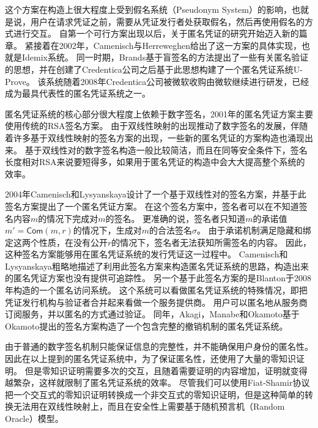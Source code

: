 这个方案在构造上很大程度上受到假名系统（Pseudonym System）\cite{chen1996access,lysyanskaya1999pseudonym}的影响，也就是说，用户在请求凭证之前，需要从凭证发行者处获取假名，然后再使用假名的方式进行交互。
自第一个可行方案出现以后，关于匿名凭证的研究开始迈入新的篇章。
紧接着在2002年，Camenisch与Herreweghen给出了这一方案的具体实现，也就是Idemix系统\cite{camenisch2002design}。
同一时期，Brands基于盲签名的方法提出了一些有关匿名验证的思想\cite{brands2000rethinking}，并在创建了Credentica公司之后基于此思想构建了一个匿名凭证系统U-Prove。
该系统随着2008年Credentica公司被微软收购由微软继续进行研发\cite{paquin2011u}，已经成为最具代表性的匿名凭证系统之一。

匿名凭证系统的核心部分很大程度上依赖于数字签名，2001年的匿名凭证方案主要使用传统的RSA签名方案。
由于双线性映射的出现推动了数字签名的发展，伴随着许多基于双线性映射的签名方案的出现\cite{boneh2001short,camenisch2004signature,okamoto2006efficient}，一些新的匿名凭证的方案构造也涌现出来。
基于双线性对的数字签名构造一般比较简洁，而且在同等安全条件下，签名长度相对RSA来说要短得多，如果用于匿名凭证的构造中会大大提高整个系统的效率。

2004年Camenisch和Lysyanskaya设计了一个基于双线性对的签名方案，并基于此签名方案提出了一个匿名凭证方案\cite{camenisch2004signature}。
在这个签名方案中，签名者可以在不知道签名内容$m$的情况下完成对$m$的签名。
更准确的说，签名者只知道$m$的承诺值$m'=\mathsf{Com}(m,r)$的情况下，生成对$m$的合法签名$\sigma$。
由于承诺机制满足隐藏和绑定这两个性质，在没有公开$r$的情况下，签名者无法获知所需签名的内容。
因此，这种签名方案能够用在匿名凭证系统的发行凭证这一过程中。
Camenisch和Lysyanskaya粗略地描述了利用此签名方案来构造匿名凭证系统的思路，构造出来的匿名凭证方案也没有提供可追踪性。
另一个基于此签名方案的是Blanton于2008年构造的一个匿名访问系统\cite{blanton2008online}。
这个系统可以看做匿名凭证系统的特殊情况，即把凭证发行机构与验证者合并起来看做一个服务提供商。
用户可以匿名地从服务商订阅服务，并以匿名的方式通过验证。
同年，Akagi，Manabe和Okamoto基于Okamoto提出的签名方案\cite{okamoto2006efficient}构造了一个包含完整的撤销机制的匿名凭证系统\cite{akagi2008efficient}。

由于普通的数字签名机制只能保证信息的完整性，并不能确保用户身份的匿名性。
因此在以上提到的匿名凭证系统中，为了保证匿名性，还使用了大量的零知识证明。
但是零知识证明需要多次的交互，且随着需要证明的内容增加，证明就变得越繁杂，这样就限制了匿名凭证系统的效率。
尽管我们可以使用Fiat-Shamir协议\cite{fiat1986prove}把一个交互式的零知识证明转换成一个非交互式的零知识证明，但是这种简单的转换无法用在双线性映射上\cite{张严2012匿名凭证方案研究进展}，而且在安全性上需要基于随机预言机（Random Oracle）模型。

